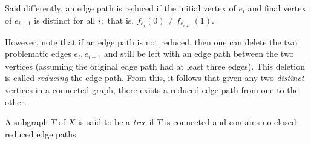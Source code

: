 \documentclass[12pt]{article}
\begin{document}
Said differently, an edge path is reduced if the initial vertex of $e_i$ and final vertex of $e_{i+1}$ is distinct for all $i;$ that is, $f_{e_i}(0) \neq f_{e_{i+1}}(1).$

However, note that if an edge path is not reduced, then one can delete the two problematic edges $e_i, e_{i+1}$ and still be left with an edge path between the two vertices (assuming the original edge path had at least three edges). This deletion is called \emph{reducing} the edge path. From this, it follows that given any two \emph{distinct} vertices in a connected graph, there exists a reduced edge path from one to the other.

\begin{defn}[Tree]
	A subgraph $T$ of $X$ is said to be a \emph{tree} if $T$ is connected and contains no closed reduced edge paths.
\end{defn}
\end{document}
